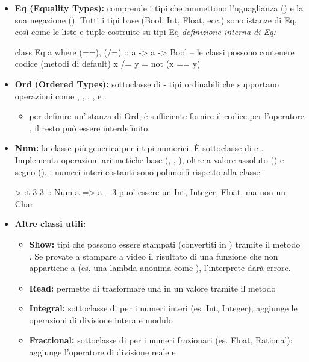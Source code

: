 \begin{itemize}
    \item \textbf{Eq (Equality Types):} comprende i tipi che ammettono l'uguaglianza (\code{==}) e la sua negazione (\code{/=}). Tutti i tipi base (Bool, Int, Float, ecc.) sono istanze di Eq, così come le liste e tuple costruite su tipi Eq
        \subitem \textit{definizione interna di Eq:}
        \begin{haskellbox}{}
class Eq a where
  (==), (/=) :: a -> a -> Bool
  -- le classi possono contenere codice (metodi di default)
  x /= y = not (x == y)
\end{haskellbox}

    \item \textbf{Ord (Ordered Types):} sottoclasse di  - tipi ordinabili che supportano operazioni come \code{<=}, \code{<}, \code{>=}, \code{>},  e .
\begin{itemize}
    \item per definire un'istanza di Ord, è sufficiente fornire il codice per l'operatore \code{<}, il resto può essere interdefinito.
\end{itemize}

    \item \textbf{Num:} la classe più generica per i tipi numerici. È sottoclasse di  e . Implementa operazioni aritmetiche base (\code{+}, \code{-}, \code{*}), oltre a valore assoluto () e segno ().
        \subitem i numeri interi costanti sono polimorfi rispetto alla classe :
        \begin{haskellbox}{}
> :t 3
3 :: Num a => a  -- 3 puo' essere un Int, Integer, Float, ma non un Char
\end{haskellbox}

    \item \textbf{Altre classi utili:}
        \begin{itemize}
            \item \textbf{Show:} tipi che possono essere stampati (convertiti in ) tramite il metodo . Se provate a stampare a video il risultato di una funzione che non appartiene a  (es. una lambda anonima come ), l'interprete darà errore.
            \item \textbf{Read:} permette di trasformare una  in un valore tramite il metodo 
            \item \textbf{Integral:} sottoclasse di  per i numeri interi (es. Int, Integer); aggiunge le operazioni di divisione intera  e modulo 
            \item \textbf{Fractional:} sottoclasse di  per i numeri frazionari (es. Float, Rational); aggiunge l'operatore di divisione reale \code{(/)} e 
        \end{itemize}
\end{itemize}


